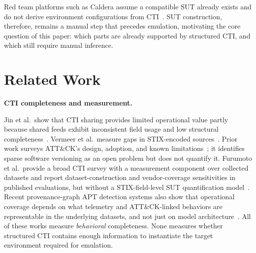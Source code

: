 \documentclass[sigconf,anonymous,review]{acmart}
\newcommand{\caldera}{Caldera\xspace}
\newcommand{\myparagraph}[1]{\textbf{#1.}\hspace{0.5em}}
\begin{document}
Red team platforms such as \caldera{} assume a compatible SUT already exists and do not derive environment configurations from CTI~\cite{applebaum2016caldera}. SUT construction, therefore, remains a manual step that precedes emulation, motivating the core question of this paper: which parts are already supported by structured CTI, and which still require manual inference.


\section{Related Work}\label{sec:related}

\myparagraph{CTI completeness and measurement}

Jin et al.\ show that CTI sharing provides limited operational value partly because shared feeds exhibit inconsistent field usage and low structural completeness~\cite{DBLP:conf/ndss/JinKLBKK24}. Vermeer et al.\ measure gaps in STIX-encoded sources~\cite{vermeer2022evolution}. Prior work surveys ATT\&CK's design, adoption, and known limitations~\cite{strom2018mitre,DBLP:conf/uss/VirkudIR00024}; it identifies sparse software versioning as an open problem but does not quantify it. Furumoto et al.\ provide a broad CTI survey with a measurement component over collected datasets and report dataset-construction and vendor-coverage sensitivities in published evaluations, but without a STIX-field-level SUT quantification model~\cite{furumoto2025ctisurvey}. Recent provenance-graph APT detection systems also show that operational coverage depends on what telemetry and ATT\&CK-linked behaviors are representable in the underlying datasets, and not just on model architecture~\cite{milajerdi2019holmes,han2020unicorn,DBLP:conf/uss/Dong0NS0LLX23,DBLP:conf/uss/YangXXLZ23,Li_2024,DBLP:conf/uss/JiaXN0ZW24,DBLP:conf/uss/Zhang0YK0KF25}. All of these works measure \emph{behavioral} completeness. None measures whether structured CTI contains enough information to instantiate the target environment required for emulation.
\end{document}
